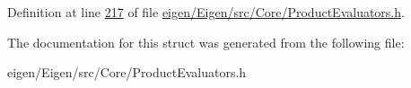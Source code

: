 Definition at line \hyperlink{eigen_2_eigen_2src_2_core_2_product_evaluators_8h_source_l00217}{217} of file \hyperlink{eigen_2_eigen_2src_2_core_2_product_evaluators_8h_source}{eigen/\+Eigen/src/\+Core/\+Product\+Evaluators.\+h}.



The documentation for this struct was generated from the following file\+:\begin{DoxyCompactItemize}
\item 
eigen/\+Eigen/src/\+Core/\+Product\+Evaluators.\+h\end{DoxyCompactItemize}
